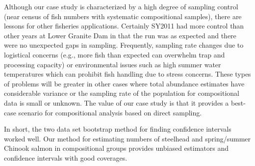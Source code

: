 \documentclass[12pt]{article}
\begin{document}
Although our case study is characterized by a high degree of sampling control (near census of fish numbers with systematic compositional samples), there are lessons for other fisheries applications. Certainly SY2011 had more control than other years at Lower Granite Dam in that the run was as expected and there were no unexpected gaps in sampling. Frequently, sampling rate changes due to logistical concerns (e.g., more fish than expected can overwhelm trap and processing capacity) or environmental issues such as high summer water temperatures which can prohibit fish handling due to stress concerns. These types of problems will be greater in other cases where total abundance estimates have considerable variance or the sampling rate of the population for compositional data is small or unknown. The value of our case study is that it provides a best-case scenario for compositional analysis based on direct sampling.

In short, the two data set bootstrap method for finding confidence intervals worked well. Our method for estimating numbers of steelhead and spring/summer Chinook salmon in compositional groups provides unbiased estimators and confidence intervals with good coverages.



\end{document}

